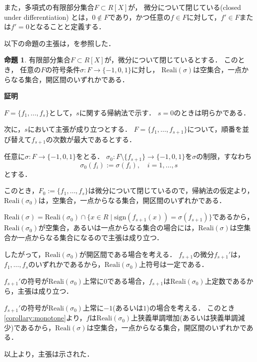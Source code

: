\documentclass[uplatex, dvipdfmx]{jsarticle}
\makeatletter
\numberwithin{equation}{section}
\renewenvironment{proof}[1][\proofname]{\par
  \pushQED{\qed}%
  \normalfont \topsep6\p@\@plus6\p@\relax
  \trivlist
  \item\relax
  {\bfseries
  #1\@addpunct{.}}\hspace\labelsep\ignorespaces
}{
  \popQED\endtrivlist\@endpefalse
}
\newcommand{\Reali}{\mathrm{Reali}}
\newcommand{\sign}{\mathrm{sign}}
\newcommand{\map}[3]{{#1}\colon{#2}\rightarrow{#3}}
\theoremstyle{definition}
\newtheorem{proposition}[definition]{命題}
\renewcommand{\proofname}{\textbf{証明}}
\makeatother
\begin{document}
また，多項式の有限部分集合$F \subset R[X]$が，
微分について閉じている(closed under differentiation)
とは，$0 \not \in F$であり，かつ任意の$f \in F$に対して，$f' \in F$または$f'=0$となることと定義する．


以下の命題の主張は，\cite[Lemma 5.33.]{MR2248869}を参照した．

\begin{proposition}\label{proposition:Thom}
     有限部分集合$F \subset R[X]$が，微分について閉じているとする．
     このとき， 任意の$F$の符号条件$\map{\sigma}{F}{\{-1,0,1\}}$に対し，
     $\Reali(\sigma)$は空集合，一点からなる集合，開区間のいずれかである．
\end{proposition}

\begin{proof}
     $F = \{f_1, \dots, f_s\}$として，$s$に関する帰納法で示す．
     $s = 0$のときは明らかである．
     
     次に，$s$において主張が成り立つとする．
     $F = \{f_1, \dots, f_{s+1}\}$について，順番を並び替えて$f_{s+1}$の次数が最大であるとする．

     任意に$\map{\sigma}{F}{\{-1,0,1\}}$をとる．
     $\map{\sigma_0}{F \setminus \{f_{s+1}\}}{\{-1,0,1\}}$を$\sigma$の制限，すなわち
     \begin{equation}
          \sigma_0(f_i) := \sigma(f_i), \quad i=1, \dots, s
     \end{equation}
     とする．

     このとき，$F_0 := \{f_1, \dots, f_{s}\}$は微分について閉じているので，帰納法の仮定より，
     $\Reali(\sigma_0)$は，空集合，一点からなる集合，開区間のいずれかである．

     $\Reali(\sigma) = \Reali({\sigma_0}) \cap \{x \in R \mid \sign(f_{s+1}(x)) = \sigma(f_{s+1})\}$であるから，
     $\Reali({\sigma_0})$が空集合，あるいは一点からなる集合の場合には，$\Reali(\sigma)$は空集合か一点からなる集合になるので主張は成り立つ．

     したがって，$\Reali({\sigma_0})$が開区間である場合を考える．
     $f_{s+1}$の微分$f_{s+1}'$は，$f_1, \dots, f_s$のいずれかであるから，$\Reali({\sigma_0})$上符号は一定である．

     $f_{s+1}'$の符号が$\Reali({\sigma_0})$上常に$0$である場合，$f_{s+1}$は$\Reali({\sigma_0})$上定数であるから，主張は成り立つ．

     $f_{s+1}'$の符号が$\Reali({\sigma_0})$上常に$-1$(あるいは$1$)の場合を考える．
     このとき\cref{corollary:monotone}より，$f$は$\Reali({\sigma_0})$上狭義単調増加(あるいは狭義単調減少)であるから，$\Reali(\sigma)$は空集合，一点からなる集合，開区間のいずれかである．

     以上より，主張は示された．
\end{proof}
\end{document}

